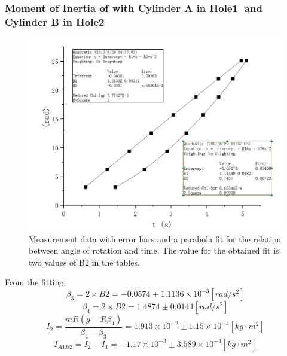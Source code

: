 \documentclass[12pt]{article}
\begin{document}
\subsubsection{Moment of Inertia of with Cylinder A in Hole\textcircled{1} and Cylinder B in Hole\textcircled{2}}
\begin{figure}[H]
\centering
\includegraphics[width=1\linewidth]{P4.jpg}
\caption{Measurement data with error bars and a parabola fit for the relation between angle of rotation and time. The value for the obtained fit is two values of B2 in the tables.}
\end{figure}
From the fitting:
$$\beta_3=2\times{B2}=-0.0574\pm1.1136\times10^{-3}[rad/s^2]$$
$$\beta_4=2\times{B2}=1.4874\pm0.0144[rad/s^2]$$
$$I_2=\frac{mR(g-R\beta_4)}{\beta_4-\beta_3}=1.913\times10^{-2}\pm1.15\times10^{-4}[kg\cdot{m^2}]$$
$$I_{A1B2}=I_2-I_1=-1.17\times10^{-3}\pm3.589\times10^{-4}[kg\cdot{m^2}]$$
\end{document}
